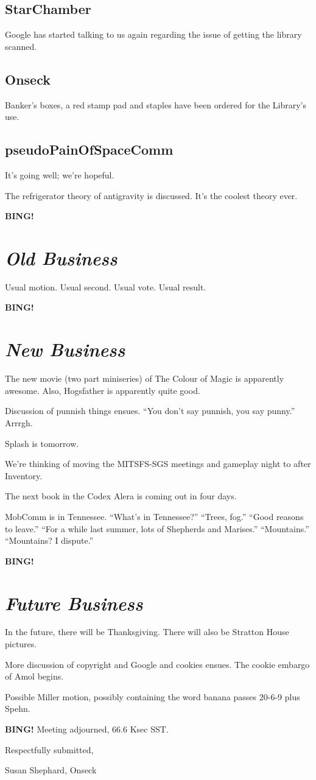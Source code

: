 \documentclass[10pt]{article}
\newcommand{\bing}{{\bf BING!} }
\newcommand{\goto}[1]{\bing \vskip 12pt \section*{{\em{#1}}}}
\newcommand{\ps}{ plus Spehn\xspace}
\newcommand{\onseck}{Susan Shephard, Onseck}
\begin{document}
\subsection*{StarChamber}
Google has started talking to us again regarding the issue of getting the library scanned.

\subsection*{Onseck}
Banker's boxes, a red stamp pad and staples have been ordered for the Library's use.

\subsection*{pseudoPainOfSpaceComm}
It's going well; we're hopeful.

The refrigerator theory of antigravity is discussed. It's the coolest theory ever.

\goto{Old Business}

Usual motion. Usual second. Usual vote. Usual result.

\goto{New Business}

The new movie (two part miniseries) of The Colour of Magic is apparently awesome. Also, Hogsfather is apparently quite good.

Discussion of punnish things ensues. ``You don't say punnish, you say punny.'' Arrrgh.

Splash is tomorrow.

We're thinking of moving the MITSFS-SGS meetings and gameplay night to after Inventory.

The next book in the Codex Alera is coming out in four days.

MobComm is in Tennessee. ``What's in Tennessee?'' ``Trees, fog.'' ``Good reasons to leave.'' ``For a while last summer, lots of Shepherds and Marises.'' ``Mountains.'' ``Mountains? I dispute.''

\goto{Future Business}

In the future, there will be Thanksgiving. There will also be Stratton House pictures.

More discussion of copyright and Google and cookies ensues. The cookie embargo of Amol begins. 

Possible Miller motion, possibly containing the word banana passes 20-6-9\ps.

\bing
\noindent
Meeting adjourned, 66.6 Ksec SST.

\vspace{18pt}

\centerline{Respectfully submitted,}
\centerline{\onseck}
\end{document}
